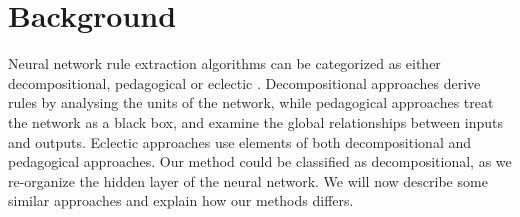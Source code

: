 










\section{Background}\label{ch5:bg}

Neural network rule extraction algorithms can be categorized as either decompositional, pedagogical or eclectic \cite{Andrews1995a}. Decompositional approaches derive rules by analysing the units of the network, while pedagogical approaches treat the network as a black box, and examine the global relationships between inputs and outputs. Eclectic approaches use elements of both decompositional and pedagogical approaches. Our method could be classified as decompositional, as we re-organize the hidden layer of the neural network. We will now describe some similar approaches and explain how our methods differs.

